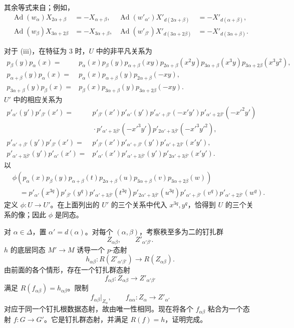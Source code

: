 其余等式来自；例如，
\[
\begin{aligned}
 \operatorname{Ad}(w_\alpha)X_{2\alpha+\beta}&=-X_{\alpha+\beta},&
 \operatorname{Ad}(w'_{\alpha'})X'_{d(2\alpha+\beta)}
   &=-X'_{d(\alpha+\beta)},\\
 \operatorname{Ad}(w_\beta)X_{3\alpha+2\beta}&=-X_{3\alpha+\beta},&
 \operatorname{Ad}(w'_{\beta'})X'_{d(3\alpha+2\beta)}
   &=-X'_{d(3\alpha+\beta)}.
\end{aligned}
\]

对于 (iii)，在特征为 \(3\) 时，\(U\) 中的非平凡关系为
\[
\begin{aligned}
 p_\beta(y)p_\alpha(x)
  ={}&p_\alpha(x)p_\beta(y)p_{\alpha+\beta}(xy)
  p_{2\alpha+\beta}(x^2y)p_{3\alpha+\beta}(x^3y)
  p_{3\alpha+2\beta}(x^3y^2),\\
 p_{\alpha+\beta}(y)p_\alpha(x)
  ={}&p_\alpha(x)p_{\alpha+\beta}(y)p_{2\alpha+\beta}(-xy),\\
 p_{3\alpha+\beta}(y)p_\beta(x)
  ={}&p_\beta(x)p_{3\alpha+\beta}(y)p_{3\alpha+2\beta}(-xy).
\end{aligned}
\]
\(U'\) 中的相应关系为
\[
\begin{aligned}
 p'_{\alpha'}(y')p'_{\beta'}(x')
  ={}&p'_{\beta'}(x')p'_{\alpha'}(y')
  p'_{\alpha'+\beta'}(-x'y')p'_{\alpha'+2\beta'}(-x'^2y')\\
  &{}\cdot p'_{\alpha'+3\beta'}(-x'^3y')
  p'_{2\alpha'+3\beta'}(-x'^3y'^2),\\
 p'_{\alpha'+\beta'}(y')p'_{\beta'}(x')
  ={}&p'_{\beta'}(x')p'_{\alpha'+\beta'}(y')
  p'_{\alpha'+2\beta'}(x'y'),\\
 p'_{\alpha'+3\beta'}(y')p'_{\alpha'}(x')
  ={}&p'_{\alpha'}(x')p'_{\alpha'+3\beta'}(y')
  p'_{2\alpha'+3\beta'}(x'y').
\end{aligned}
\]
以
\[
\begin{aligned}
 &\phi\!\left(
 p_\alpha(x)p_\beta(y)p_{\alpha+\beta}(t)p_{2\alpha+\beta}(u)
 p_{3\alpha+\beta}(v)p_{3\alpha+2\beta}(w)\right)\\
 &\quad=
 p'_{\alpha'}(x^{3q})p'_{\beta'}(y^q)
 p'_{\alpha'+3\beta'}(t^{3q})p'_{2\alpha'+3\beta'}(u^{3q})
 p'_{\alpha'+\beta'}(v^q)p'_{\alpha'+2\beta'}(w^q).
\end{aligned}
\]
定义 \(\phi:U\to U'\)。在上面列出的 \(U'\) 的三个关系中代入 \(x^{3q},y^q\)，恰得到 \(U\) 的三个关系的像；因此 \(\phi\) 是同态。

对 \(\alpha\in\Delta\)，置 \(\alpha'=d(\alpha)\)。对每个 \((\alpha,\beta)\)，考察秩至多为二的钉扎群
\[
  Z_{\alpha\beta},\qquad Z'_{\alpha'\beta'}.
\]
\(h\) 的底层同态 \(M'\to M\) 诱导一个 \(p\)-态射
\[
  h_{\alpha\beta}:R(Z'_{\alpha'\beta'})
    \longrightarrow R(Z_{\alpha\beta}).
\]
由前面的各个情形，存在一个钉扎群态射
\[
  f_{\alpha\beta}:Z_{\alpha\beta}
    \longrightarrow Z'_{\alpha'\beta'}
\]
满足 \(R(f_{\alpha\beta})=h_{\alpha\beta}\)。限制
\[
  f_{\alpha\beta}|_{Z_\alpha},
  \qquad f_{\alpha\alpha}:Z_\alpha\to Z'_{\alpha'}
\]
对应于同一个钉扎根数据态射，故由唯一性相同。现在将各个 \(f_{\alpha\beta}\) 粘合为一个态射 \(f:G\to G'\)。它是钉扎群态射，并满足 \(R(f)=h\)，证明完成。

